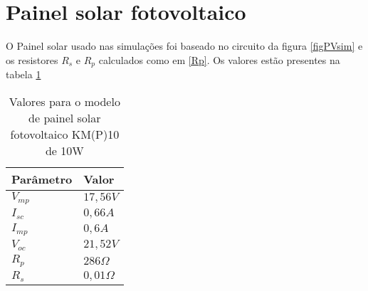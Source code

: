 \section{Painel solar fotovoltaico}
\par O Painel solar usado nas simulações foi baseado no circuito da figura \ref{figPVsim} e os resistores $R_s$ e $R_p$ calculados como em \ref{Rp}. Os valores estão presentes na tabela \ref{t_PV}

\begin{table}[H]
\centering
\caption{Valores para o modelo de painel solar fotovoltaico KM(P)10 de 10W}
\begin{tabular}{ll}
\hline
Parâmetro & Valor \\\hline
$V_{mp}$       & $17,56V$                    \\
$I_{sc}$       & $0,66A$                      \\
$I_{mp}$       & $0,6A$                       \\
$V_{oc}$       & $21,52V$                     \\
$R_p$       & $286\Omega$               \\
$R_s$        & $0,01\Omega$                    \\
\hline
\end{tabular}
\label{t_PV}
\end{table}

